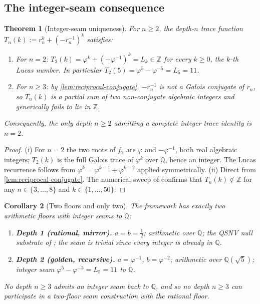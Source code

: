 \documentclass[11pt,a4paper]{article}
\theoremstyle{plain}
\newtheorem{theorem}{Theorem}[section]
\newtheorem{corollary}[theorem]{Corollary}
\theoremstyle{definition}
\theoremstyle{remark}
\numberwithin{equation}{section}
\providecommand{\Z}{\mathbb{Z}}
\providecommand{\Q}{\mathbb{Q}}
\providecommand{\vp}{\varphi}
\providecommand{\half}{\tfrac{1}{2}}
\providecommand{\Lk}{L}
\begin{document}
\subsection{The integer-seam consequence}

\begin{theorem}[Integer-seam uniqueness]
\label{thm:integer-seam}
For $n \ge 2$, the depth-$n$ trace function
$T_n(k) := r_n^k + (-r_n^{-1})^k$ satisfies:
\begin{enumerate}[label=\textnormal{(\roman*)}]
  \item For $n = 2$: $T_2(k) = \vp^k + (-\vp^{-1})^k = \Lk_k \in \Z$
    for every $k \ge 0$, the $k$-th Lucas number.  In particular
    $T_2(5) = \vp^5 - \vp^{-5} = \Lk_5 = 11$.
  \item For $n \ge 3$: by \cref{lem:reciprocal-conjugate}, $-r_n^{-1}$
    is not a Galois conjugate of $r_n$, so $T_n(k)$ is a partial
    sum of two non-conjugate algebraic integers and generically
    fails to lie in $\Z$.
\end{enumerate}
Consequently, the only depth $n \ge 2$ admitting a complete integer
trace identity is $n = 2$.
\end{theorem}

\begin{proof}
(i) For $n = 2$ the two roots of $f_2$ are $\vp$ and $-\vp^{-1}$,
both real algebraic integers; $T_2(k)$ is the full Galois trace
of $\vp^k$ over $\Q$, hence an integer.  The Lucas recurrence
follows from $\vp^k = \vp^{k-1} + \vp^{k-2}$ applied symmetrically.
(ii) Direct from \cref{lem:reciprocal-conjugate}.  The numerical
sweep of \cite[\S5]{two-floor} confirms that $T_n(k) \notin \Z$
for any $n \in \{3, \ldots, 8\}$ and $k \in \{1, \ldots, 50\}$.
\end{proof}

\begin{corollary}[Two floors and only two]
\label{cor:two-floor}
The framework has exactly two arithmetic floors with integer seams
to $\Q$:
\begin{enumerate}[label=\textnormal{(\arabic*)}]
  \item \textbf{Depth 1 (rational, mirror).}  $a = b = \half$;
    arithmetic over $\Q$; the QSNV null substrate of
    \cite{golden-tetrad}; the seam is trivial since every integer
    is already in $\Q$.
  \item \textbf{Depth 2 (golden, recursive).}  $a = \vp^{-1}$,
    $b = \vp^{-2}$; arithmetic over $\Q(\sqrt 5)$; integer seam
    $\vp^5 - \vp^{-5} = \Lk_5 = 11$ to $\Q$.
\end{enumerate}
No depth $n \ge 3$ admits an integer seam back to $\Q$, and so no
depth $n \ge 3$ can participate in a two-floor seam construction
with the rational floor.
\end{corollary}
\end{document}
